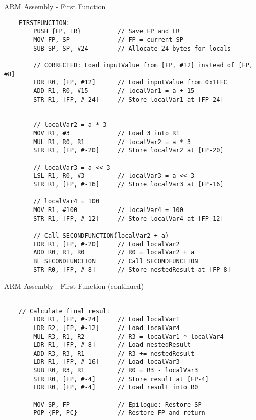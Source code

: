 \documentclass[aspectratio=169]{beamer}
\begin{document}
\begin{frame}[fragile]{ARM Assembly - First Function}
    \begin{verbatim}
    FIRSTFUNCTION:
        PUSH {FP, LR}          // Save FP and LR
        MOV FP, SP             // FP = current SP
        SUB SP, SP, #24        // Allocate 24 bytes for locals
    
        // CORRECTED: Load inputValue from [FP, #12] instead of [FP, #8]
        LDR R0, [FP, #12]      // Load inputValue from 0x1FFC
        ADD R1, R0, #15        // localVar1 = a + 15
        STR R1, [FP, #-24]     // Store localVar1 at [FP-24]
    
    
        // localVar2 = a * 3
        MOV R1, #3             // Load 3 into R1
        MUL R1, R0, R1         // localVar2 = a * 3
        STR R1, [FP, #-20]     // Store localVar2 at [FP-20]
    
        // localVar3 = a << 3
        LSL R1, R0, #3         // localVar3 = a << 3
        STR R1, [FP, #-16]     // Store localVar3 at [FP-16]
    
        // localVar4 = 100
        MOV R1, #100           // localVar4 = 100
        STR R1, [FP, #-12]     // Store localVar4 at [FP-12]
    
        // Call SECONDFUNCTION(localVar2 + a)
        LDR R1, [FP, #-20]     // Load localVar2
        ADD R0, R1, R0         // R0 = localVar2 + a
        BL SECONDFUNCTION      // Call SECONDFUNCTION
        STR R0, [FP, #-8]      // Store nestedResult at [FP-8]
\end{verbatim}
\end{frame}

\begin{frame}[fragile]{ARM Assembly - First Function (continued)}
    \begin{verbatim}

    // Calculate final result
        LDR R1, [FP, #-24]     // Load localVar1
        LDR R2, [FP, #-12]     // Load localVar4
        MUL R3, R1, R2         // R3 = localVar1 * localVar4
        LDR R1, [FP, #-8]      // Load nestedResult
        ADD R3, R3, R1         // R3 += nestedResult
        LDR R1, [FP, #-16]     // Load localVar3
        SUB R0, R3, R1         // R0 = R3 - localVar3
        STR R0, [FP, #-4]      // Store result at [FP-4]
        LDR R0, [FP, #-4]      // Load result into R0
    
        MOV SP, FP             // Epilogue: Restore SP
        POP {FP, PC}           // Restore FP and return
    \end{verbatim}
\end{frame}
\end{document}
